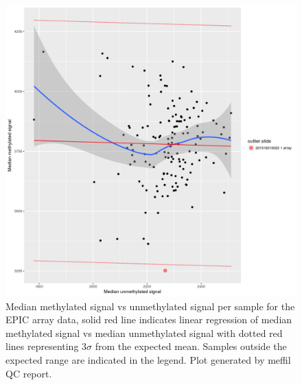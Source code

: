 \documentclass[]{book}
\begin{document}
\begin{figure}

{\centering \includegraphics[width=0.8\linewidth]{figs/MAVIDOSqcEPICmethVsUnmeth} 

}

\caption{Median methylated signal vs unmethylated signal per sample for the EPIC array data, solid red line indicates linear regression of median methylated signal vs median unmethylated signal with dotted red lines representing \(3\sigma\) from the expected mean. Samples outside the expected range are indicated in the legend. Plot generated by meffil QC report.}\label{fig:MAVIDOSqcEPICmethVsUnmeth}
\end{figure}
\end{document}
